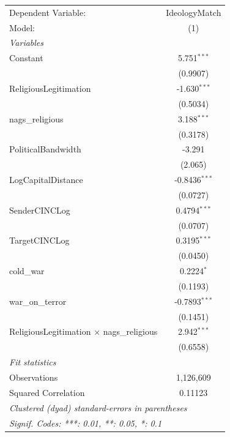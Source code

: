 
\begingroup
\centering
\begin{tabular}{lc}
   \tabularnewline \midrule \midrule
   Dependent Variable:                              & IdeologyMatch\\  
   Model:                                           & (1)\\  
   \midrule
   \emph{Variables}\\
   Constant                                         & 5.751$^{***}$\\   
                                                    & (0.9907)\\   
   ReligiousLegitimation                            & -1.630$^{***}$\\   
                                                    & (0.5034)\\   
   nags\_religious                                  & 3.188$^{***}$\\   
                                                    & (0.3178)\\   
   PoliticalBandwidth                               & -3.291\\   
                                                    & (2.065)\\   
   LogCapitalDistance                               & -0.8436$^{***}$\\   
                                                    & (0.0727)\\   
   SenderCINCLog                                    & 0.4794$^{***}$\\   
                                                    & (0.0707)\\   
   TargetCINCLog                                    & 0.3195$^{***}$\\   
                                                    & (0.0450)\\   
   cold\_war                                        & 0.2224$^{*}$\\   
                                                    & (0.1193)\\   
   war\_on\_terror                                  & -0.7893$^{***}$\\   
                                                    & (0.1451)\\   
   ReligiousLegitimation $\times$ nags\_religious   & 2.942$^{***}$\\   
                                                    & (0.6558)\\   
   \midrule
   \emph{Fit statistics}\\
   Observations                                     & 1,126,609\\  
   Squared Correlation                              & 0.11123\\  
   \midrule \midrule
   \multicolumn{2}{l}{\emph{Clustered (dyad) standard-errors in parentheses}}\\
   \multicolumn{2}{l}{\emph{Signif. Codes: ***: 0.01, **: 0.05, *: 0.1}}\\
\end{tabular}
\par\endgroup


